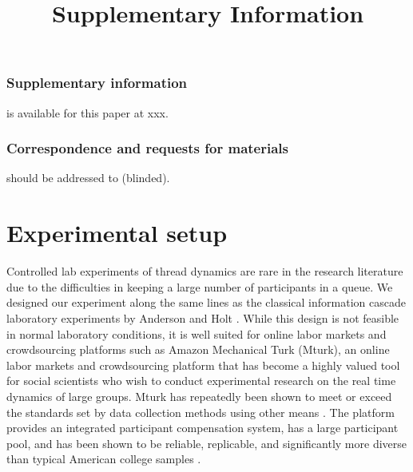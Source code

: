 \documentclass[9pt,a4paper,twocolumn,lineno]{article}
\begin{document}
\subsubsection*{Supplementary information} is available for this paper at xxx.
\subsubsection*{Correspondence and requests for materials} should be addressed to (blinded).




\newpage
\appendix
\onecolumn

\title{\Huge \center Supplementary Information}


\section*{Experimental setup}
Controlled lab experiments of thread dynamics are rare in the research literature due to the difficulties in keeping a large number of participants in a queue. We designed our experiment along the same lines as the classical information cascade laboratory experiments by Anderson and Holt \cite{anderson1997information}. While this design is not feasible in normal laboratory conditions, it is well suited for online labor markets and crowdsourcing platforms such as Amazon Mechanical Turk (Mturk), an online labor markets and crowdsourcing platform that has become a highly valued tool for social scientists who wish to conduct experimental research on the real time dynamics of large groups. Mturk has repeatedly been shown to meet or exceed the standards set by data collection methods using other means \cite{berinsky2012evaluating, buhrmester2018evaluation}. The platform provides an integrated participant compensation system, has a large participant pool, and has been shown to be reliable, replicable, and significantly more diverse than typical American college samples \cite{mason2009financial, buhrmester2011amazon, crump2013evaluating, rand2012promise, horton2011online}.
\end{document}
